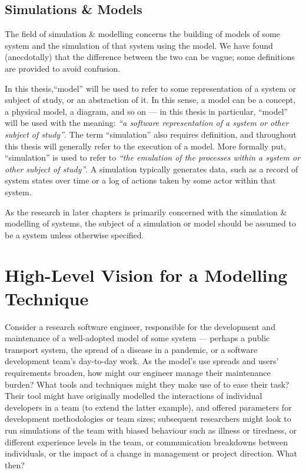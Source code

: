 \subsection{Simulations \& Models}

The field of simulation \& modelling concerns the building of models of some
system and the simulation of that system using the model. We have found
(anecdotally) that the difference between the two can be vague; some definitions
are provided to avoid confusion.

In this thesis,``model'' will be used to refer to some representation of a
system or subject of study, or an abstraction of it. In this sense, a model can
be a concept, a physical model, a diagram, and so on --- in this thesis in
particular, ``model'' will be used with the meaning: \emph{``a software
  representation of a system or other subject of study''}. The term
``simulation'' also requires definition, and throughout this thesis will
generally refer to the execution of a model. More formally put, ``simulation''
is used to refer to \emph{``the emulation of the processes within a system or
  other subject of study''}. A simulation typically generates data, such as a
record of system states over time or a log of actions taken by some actor within
that system.

As the research in later chapters is primarily concerned with the simulation \&
modelling of \sociotechnical systems, the subject of a simulation or model
should be assumed to be a \sociotechnical system unless otherwise specified.




\section{High-Level Vision for a \SocioTechnical Modelling Technique}
\label{intro_high_level_vision}

Consider a research software engineer, responsible for the development and
maintenance of a well-adopted model of some \sociotechnical system --- perhaps a
public transport system, the spread of a disease in a pandemic, or a software
development team's day-to-day work. As the model's use spreads and users'
requirements broaden, how might our engineer manage their maintenance burden?
What tools and techniques might they make use of to ease their task? Their tool
might have originally modelled the interactions of individual developers in a
team (to extend the latter example), and offered parameters for development
methodologies or team sizes; subsequent researchers might look to run
simulations of the team with biased behaviour such as illness or tiredness, or
different experience levels in the team, or communication breakdowns between
individuals, or the impact of a change in management or project direction. What
then?

